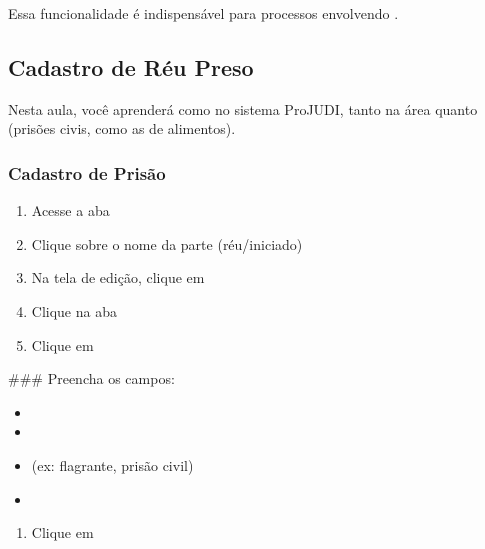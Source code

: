 \documentclass[letterpaper,10pt,brazil]{sphinxmanual}
\begin{document}
\sphinxAtStartPar
Essa funcionalidade é indispensável para processos envolvendo .

\sphinxstepscope


\subsection{Cadastro de Réu Preso}
\label{\detokenize{projud_25_cadastro reupreso:cadastro-de-reu-preso}}\label{\detokenize{projud_25_cadastro reupreso::doc}}
\sphinxAtStartPar
Nesta aula, você aprenderá como  no sistema ProJUDI, tanto na área  quanto  (prisões civis, como as de alimentos).


\subsubsection{Cadastro de Prisão}
\label{\detokenize{projud_25_cadastro reupreso:cadastro-de-prisao}}\begin{enumerate}
%
\item {} 
\sphinxAtStartPar
Acesse a aba 

\item {} 
\sphinxAtStartPar
Clique sobre o nome da parte (réu/iniciado)

\item {} 
\sphinxAtStartPar
Na tela de edição, clique em 

\item {} 
\sphinxAtStartPar
Clique na aba 

\item {} 
\sphinxAtStartPar
Clique em 

\end{enumerate}

\sphinxAtStartPar
\#\#\# Preencha os campos:
\begin{itemize}
\item {} 
\sphinxAtStartPar
{}

\item {} 
\sphinxAtStartPar
{}

\item {} 
\sphinxAtStartPar
{} (ex: flagrante, prisão civil)

\item {} 
\sphinxAtStartPar
{}

\end{itemize}
\begin{enumerate}
%
\setcounter{enumi}{5}
\item {} 
\sphinxAtStartPar
Clique em 

\end{enumerate}
\end{document}
